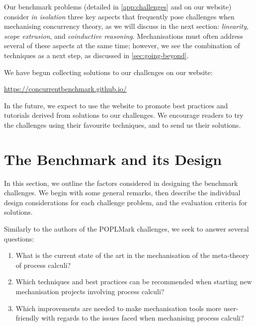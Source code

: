 \documentclass[runningheads]{llncs}
\begin{document}
Our benchmark problems (detailed in \cref{app:challenges} and on our website) consider
\emph{in isolation} three key aspects that frequently pose challenges
when mechanising concurrency theory, as we will discuss in the next section: \emph{linearity}, \emph{scope
  extrusion}, and \emph{coinductive reasoning}.
Mechanisations must often address several of these aspects at the same time; however, we
see the combination of techniques as a next
step, as discussed in \cref{sec:going-beyond}.

We have begun collecting solutions to our challenges on our website:
%
\begin{center}
  \url{https://concurrentbenchmark.github.io/}
\end{center}
%
In the future, we expect to use the website to promote best practices and tutorials derived from solutions to our challenges.
We encourage readers to try the challenges using their favourite techniques, and to send us their solutions.

\section{The Benchmark and its Design}\label{sec:design-discussion}
In this section, we outline the factors considered in designing the benchmark challenges.
We begin with some general remarks, then describe the individual design considerations for each challenge problem, and the evaluation criteria for solutions.

Similarly to the authors of the POPLMark challenges, we seek to answer several questions:
\begin{enumerate}[label=\textbf{(Q\arabic*)},leftmargin=10mm]
\item\label{item:rq1} What is the current state of the art in the mechanisation of  the meta-theory of process calculi?
\item\label{item:rq2} Which techniques and best practices can be recommended when starting new mechanisation projects involving process calculi?
\item\label{item:rq3} Which improvements are needed to make mechanisation tools more user-friendly with regards to the issues faced when mechanising process calculi?
\end{enumerate}
\end{document}
